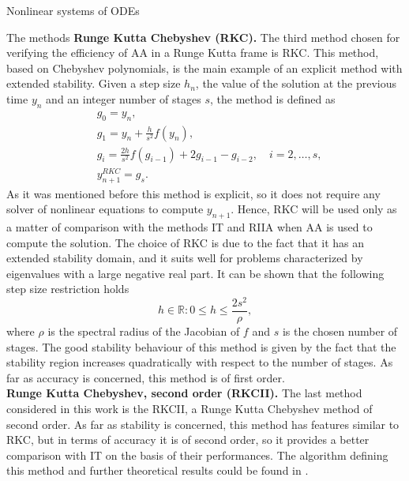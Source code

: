 \documentclass{article}
\begin{document}
\begin{section}{Nonlinear systems of ODEs}
\begin{subsection}{The methods}
\textbf{Runge Kutta Chebyshev (RKC).} The third method chosen for verifying the efficiency of AA in a Runge Kutta frame is RKC. This method, based on Chebyshev polynomials, is the main example of an explicit method with extended stability. Given a step size $h_n$, the value of the solution at the previous time $y_n$ and an integer number of stages $s$, the method is defined as 
\begin{align*}
	&g_0 = y_n, \\
	&g_1 = y_n + \frac{h}{s^2} f(y_n),\\
	&g_i = \frac{2h}{s^2}f(g_{i-1}) + 2g_{i-1} - g_{i-2}, \quad i = 2,\dots,s, \\
	&y_{n+1}^{RKC} = g_s.
\end{align*}
As it was mentioned before this method is explicit, so it does not require any solver of nonlinear equations to compute $y_{n+1}$. Hence, RKC will be used only as a matter of comparison with the methods IT and RIIA when AA is used to compute the solution. The choice of RKC is due to the fact that it has an extended stability domain, and it suits well for problems characterized by eigenvalues with a large negative real part. It can be shown that the following step size restriction holds
\begin{equation}\label{eq:RKC}
	h \in \mathbb{R} \colon 0 \leq h \leq \frac{2s^2}{\rho},
\end{equation}
where $\rho$ is the spectral radius of the Jacobian of $f$ and $s$ is the chosen number of stages. The good stability behaviour of this method is given by the fact that the stability region increases quadratically with respect to the number of stages. As far as accuracy is concerned, this method is of first order. \\

\textbf{Runge Kutta Chebyshev, second order (RKCII).} The last method considered in this work is the RKCII, a Runge Kutta Chebyshev method of second order. As far as stability is concerned, this method has features similar to RKC, but in terms of accuracy it is of second order, so it provides a better comparison with IT on the basis of their performances. The algorithm defining this method and further theoretical results could be found in \cite{HW}.
\end{subsection}


\end{section}
\end{document}
